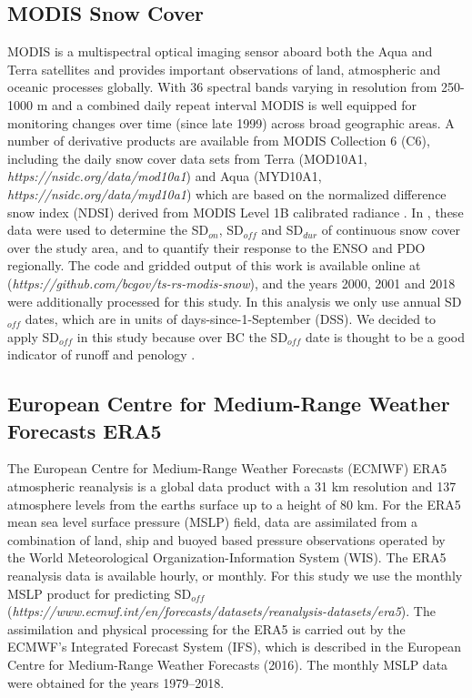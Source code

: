 \documentclass{tATO2e}
\newcommand{\sdoff}{SD$_{off}$}
\newcommand{\sdon}{SD$_{on}$}
\newcommand{\sddur}{SD$_{dur}$}
\begin{document}
\subsection{MODIS Snow Cover}
MODIS is a multispectral optical imaging sensor aboard both the Aqua and Terra satellites and provides important observations of land, atmospheric and oceanic processes globally. With 36 spectral bands varying in resolution from 250-1000 m and a combined daily repeat interval MODIS is well equipped for monitoring changes over time (since late 1999) across broad geographic areas. A number of derivative products are available from MODIS Collection 6 (C6), including the daily snow cover data sets from Terra (MOD10A1, \textit{https://nsidc.org/data/mod10a1}) and Aqua (MYD10A1, \textit{https://nsidc.org/data/myd10a1}) which are based on the normalized difference snow index (NDSI) derived from MODIS Level 1B calibrated radiance \citep{Riggs2016}. In \cite{Bevington2019}, these data were used to determine the \sdon{}, \sdoff{} and \sddur{} of continuous snow cover over the study area, and to quantify their response to the ENSO and PDO regionally. The code and gridded output of this work is available online at (\textit{https://github.com/bcgov/ts-rs-modis-snow}), and the years 2000, 2001 and 2018 were additionally processed for this study. In this analysis we only use annual \sdoff{} dates, which are in units of days-since-1-September (DSS). We decided to apply \sdoff{} in this study because over BC the \sdoff{} date is thought to be a good indicator of runoff and penology \citep{Bevington2019}.

\subsection{European Centre for Medium-Range Weather Forecasts ERA5}
The European Centre for Medium-Range Weather Forecasts (ECMWF) ERA5 atmospheric reanalysis is a global data product with a 31 km resolution and 137 atmosphere levels from the earths surface up to a height of 80 km. For the ERA5 mean sea level surface pressure (MSLP) field, data are assimilated from a combination of land, ship and buoyed based pressure observations operated by the World Meteorological Organization-Information System (WIS). The ERA5 reanalysis data is available hourly, or monthly. For this study we use the monthly MSLP product for predicting \sdoff{} (\textit{https://www.ecmwf.int/en/forecasts/datasets/reanalysis-datasets/era5}). The assimilation and physical processing for the ERA5 is carried out by the ECMWF’s Integrated Forecast System (IFS), which is described in the European Centre for Medium-Range Weather Forecasts (2016). The monthly MSLP data were obtained for the years 1979--2018.
\end{document}
